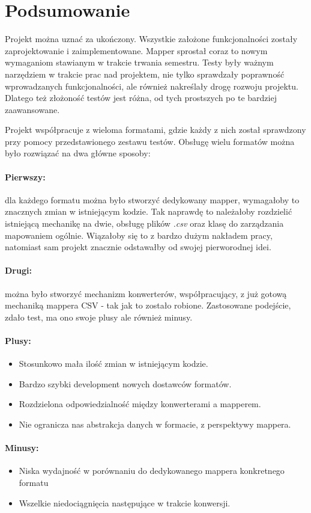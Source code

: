 \section{Podsumowanie}
Projekt można uznać za ukończony. Wszystkie założone funkcjonalności zostały zaprojektowanie i zaimplementowane. Mapper sprostał coraz to nowym wymaganiom stawianym w trakcie trwania semestru. Testy były ważnym narzędziem w trakcie prac nad projektem, nie tylko sprawdzały poprawność wprowadzanych funkcjonalności, ale również nakreślały drogę rozwoju projektu. Dlatego też złożoność testów jest różna, od tych prostszych po te bardziej zaawansowane.

Projekt współpracuje z wieloma formatami, gdzie każdy z nich został sprawdzony przy pomocy przedstawionego zestawu testów. Obsługę wielu formatów można było rozwiązać na dwa główne sposoby:
\paragraph{Pierwszy:} dla każdego formatu można było stworzyć dedykowany mapper, wymagałoby to znacznych zmian w istniejącym kodzie. Tak naprawdę to należałoby rozdzielić istniejącą mechanikę na dwie, obsługę plików \textit{.csv} oraz klasę do zarządzania mapowaniem ogólnie. Wiązałoby się to z bardzo dużym nakładem pracy, natomiast sam projekt znacznie odstawałby od swojej pierworodnej idei. 
\paragraph{Drugi:} można było stworzyć mechanizm konwerterów, współpracujący, z już gotową mechaniką mappera CSV - tak jak to zostało robione. Zastosowane podejście, zdało test, ma ono swoje plusy ale również minusy.
\paragraph{Plusy:}
\begin{itemize}
	\item Stosunkowo mała ilość zmian w istniejącym kodzie.
	\item Bardzo szybki development nowych dostawców formatów.
	\item Rozdzielona odpowiedzialność między konwerterami a mapperem.
	\item Nie ogranicza nas abstrakcja danych w formacie, z perspektywy mappera.
\end{itemize}

\paragraph{Minusy:}
\begin{itemize}
	\item Niska wydajność w porównaniu do dedykowanego mappera konkretnego formatu
	\item Wszelkie niedociągnięcia następujące w trakcie konwersji.
\end{itemize}



